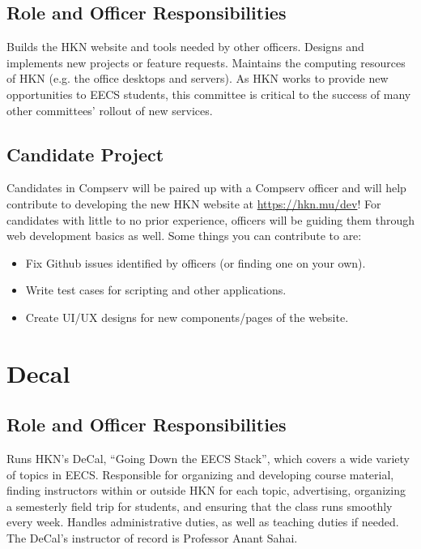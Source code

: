 \documentclass[11pt, article, oneside]{memoir}
\begin{document}
    \subsection{Role and Officer Responsibilities}
        Builds the HKN website and tools needed by other officers.
        Designs and implements new projects or feature requests.
        Maintains the computing resources of HKN (e.g. the office desktops and servers).
        As HKN works to provide new opportunities to EECS students, this committee is critical to the success of many other committees' rollout of new services.

    \subsection{Candidate Project}
        Candidates in Compserv will be paired up with a Compserv officer and will help contribute to developing the new HKN website at \url{https://hkn.mu/dev}!
        For candidates with little to no prior experience, officers will be guiding them through web development basics as well.
        Some things you can contribute to are:
        \begin{itemize}
            \item Fix Github issues identified by officers (or finding one on your own).
            \item Write test cases for scripting and other applications.
            \item Create UI/UX designs for new components/pages of the website.
        \end{itemize} 

    \section{Decal}
    \subsection{Role and Officer Responsibilities}
        Runs HKN's DeCal, ``Going Down the EECS Stack'', which covers a wide variety of topics in EECS.
        Responsible for organizing and developing course material, finding instructors within or outside HKN for each topic, advertising, organizing a semesterly field trip for students, and ensuring that the class runs smoothly every week.
        Handles administrative duties, as well as teaching duties if needed.
        The DeCal's instructor of record is Professor Anant Sahai.
\end{document}
